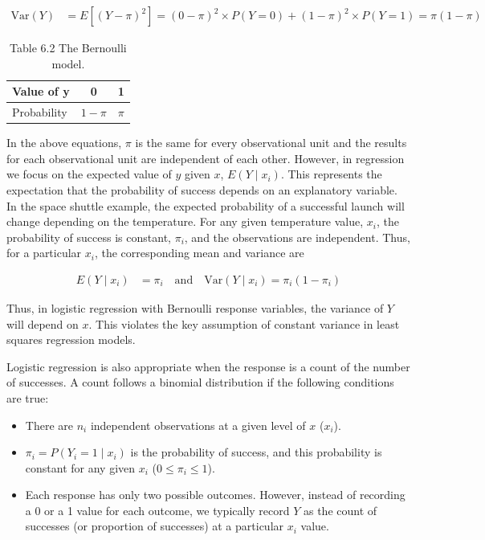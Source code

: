 \documentclass[
]{report}
\providecommand{\tightlist}{%
  \setlength{\itemsep}{0pt}\setlength{\parskip}{0pt}}
\begin{document}
\begin{align}
\mathrm{Var}(Y) &= E[(Y - \pi)^2] = (0 - \pi)^2 \times P(Y = 0) + (1 - \pi)^2 \times P(Y = 1) = \pi (1 - \pi) \tag{6.19}
\end{align}

\begin{table}[!h]
\centering
\caption{\label{tab:tab2}Table 6.2 The Bernoulli model.}
\centering
\begin{tabular}[t]{lcc}
\toprule
Value of y & 0 & 1\\
\midrule
Probability & $1 - \pi$ & $\pi$\\
\bottomrule
\end{tabular}
\end{table}

In the above equations, \(\pi\) is the same for every observational unit and the results for each observational unit are independent of each other. However, in regression we focus on the expected value of \(y\) given \(x\), \(E(Y \mid x_i)\). This represents the expectation that the probability of success depends on an explanatory variable. In the space shuttle example, the expected probability of a successful launch will change depending on the temperature. For any given temperature value, \(x_i\), the probability of success is constant, \(\pi_i\), and the observations are independent. Thus, for a particular \(x_i\), the corresponding mean and variance are

\begin{align}
E(Y \mid x_i) &= \pi_i \quad \text{and} \quad \mathrm{Var}(Y \mid x_i) = \pi_i (1 - \pi_i) 
\tag{6.20}
\end{align}

Thus, in logistic regression with Bernoulli response variables, the variance of \(Y\) will depend on \(x\). This violates
the key assumption of constant variance in least squares regression models.

Logistic regression is also appropriate when the response is a count of the number of successes. A count follows a binomial distribution if the following conditions are true:

\begin{itemize}
\tightlist
\item
  There are \(n_i\) independent observations at a given level of \(x\) (\(x_i\)).
\item
  \(\pi_i = P(Y_i = 1 \mid x_i)\) is the probability of success, and this probability is constant for any given \(x_i\) (\(0 \le \pi_i \le 1\)).
\item
  Each response has only two possible outcomes. However, instead of recording a 0 or a 1 value for each outcome, we typically record \(Y\) as the count of successes (or proportion of successes) at a particular \(x_i\) value.
\end{itemize}
\end{document}
